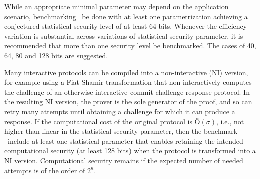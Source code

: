 While an appropriate minimal parameter may depend on the application scenario, benchmarking \shall\ be done with at least one parametrization achieving a conjectured statistical security level of at least 64 bits.
Whenever the efficiency variation is substantial across variations of statistical security parameter, it is recommended that more than one security level be benchmarked. 
The cases of 40, 64, 80 and 128 bits are suggested.


Many interactive protocols can be compiled into a non-interactive (NI) version, for example using a Fiat-Shamir transformation that non-interactively computes the challenge of an otherwise interactive commit-challenge-response protocol.
In the resulting NI version, the prover is the sole generator of the proof, and so can retry many attempts until obtaining a challenge for which it can produce a response.
If the computational cost of the original protocol is {\~O}${(\sigma)}$, i.e., not higher than linear in the statistical security parameter, then the benchmark \should\ include at least one statistical parameter that enables retaining the intended computational security (at least 128 bits) when the protocol is transformed into a NI version.
Computational security remains if the expected number of needed attempts is of the order of $2^{\kappa}$.
\loosen
